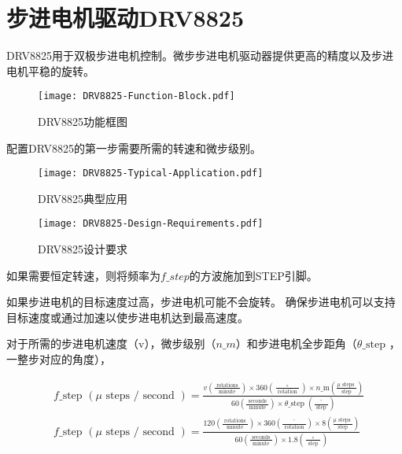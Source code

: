 \section{步进电机驱动DRV8825}

DRV8825用于双极步进电机控制。微步步进电机驱动器提供更高的精度以及步进电机平稳的旋转。

\begin{figure}[htbp]
    \centering
    \texttt{[image: DRV8825-Function-Block.pdf]}
    \caption{DRV8825功能框图}
    \label{fig:DRV8825-Function-Block}
\end{figure}

配置DRV8825的第一步需要所需的转速和微步级别。

\begin{figure}[htbp]
    \centering
    \texttt{[image: DRV8825-Typical-Application.pdf]}
    \caption{DRV8825典型应用}
    \label{fig:DRV8825-Typical-Application}
\end{figure}


\begin{figure}[htbp]
    \centering
    \texttt{[image: DRV8825-Design-Requirements.pdf]}
    \caption{DRV8825设计要求}
    \label{fig:DRV8825-Design-Requirements}
\end{figure}

如果需要恒定转速，则将频率为$f\_step$的方波施加到STEP引脚。

如果步进电机的目标速度过高，步进电机可能不会旋转。 确保步进电机可以支持目标速度或通过加速以使步进电机达到最高速度。

对于所需的步进电机速度（v），微步级别（$n\_m$）和步进电机全步距角（$\theta\_{\text {step }}$，一整步对应的角度），

\begin{equation}
    \begin{aligned}
    &f\_{\text {step }(\mu \text { steps } / \text { second })=} \frac{v\left(\frac{\text { rotations }}{\text { minute }}\right) \times 360\left(\frac{\circ}{\text { rotation }}\right) \times n\_{\mathrm{m}}\left(\frac{\mu \text { steps }}{\text { step }}\right)}{60\left(\frac{\text { seconds }}{\text { minute }}\right) \times \theta\_{\text {step }}\left(\frac{^{\circ}}{\text { step }}\right)}\\
    &f\_{\text {step }(\mu \text { steps } / \text { second })=} \frac{120\left(\frac{\text { rotations }}{\text { minute }}\right) \times 360\left(\frac{^{\circ}}{\text { rotation }}\right) \times 8\left(\frac{\mu \text { steps }}{\text { step }}\right)}{60\left(\frac{\text { seconds }}{\text { minute }}\right) \times 1.8\left(\frac{\circ}{\text { step }}\right)}
    \end{aligned}
\end{equation}

